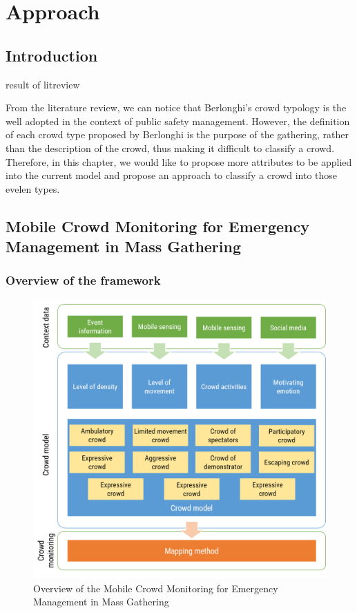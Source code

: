 \chapter{Approach}

\ifpdf
    \graphicspath{{Chapter3/Figs/Raster/}{Chapter3/Figs/PDF/}{Chapter3/Figs/}}
\else
    \graphicspath{{Chapter3/Figs/Vector/}{Chapter3/Figs/}}
\fi

\section{Introduction}

result of litreview

From the literature review, we can notice that Berlonghi's crowd typology is the well adopted in the context of public safety management. However, the definition of each crowd type proposed by Berlonghi is the purpose of the gathering, rather than the description of the crowd, thus making it difficult to classify a crowd. Therefore, in this chapter, we would like to propose more attributes to be applied into the current model and propose an approach to classify a crowd into those evelen types. 

\section{Mobile Crowd Monitoring for Emergency Management in Mass Gathering}

\subsection{Overview of the framework}

\begin{figure}[htbp!] 
	\centering    
	\includegraphics[width=1.0\textwidth]{FrameworkOverview}
	\caption{Overview of the Mobile Crowd Monitoring for Emergency Management in Mass Gathering}
	\label{fig:framrworkOverview}
\end{figure}

